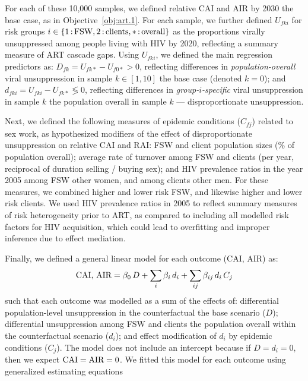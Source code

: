 \par
For each of these 10,000 samples, we defined
relative CAI and AIR by 2030 \vs the base case, as in Objective~\ref{obj:art.1}.
For each sample, we further defined
$U_{fki}$ for risk groups $i \in \{1{\,:\,}\textnormal{FSW}, 2{\,:\,}\textnormal{clients}, *{\,:\,}\textnormal{overall}\}$
as the proportions virally unsuppressed among people living with HIV by 2020,
reflecting a summary measure of ART cascade gaps.
Using $U_{fki}$, we defined the main regression predictors as:
$D_{fk} = U_{fk*} - U_{f0*} > 0$, reflecting differences in
\emph{population-overall} viral unsuppression in sample $k \in [1,10]$
\vs the base case (denoted $k = 0$); and
$d_{fki} = U_{fki} - U_{fk*} \lessgtr 0$, reflecting differences in
\emph{group-$i$-specific} viral unsuppression in sample $k$
\vs the population overall in sample $k$ --- \ie disproportionate unsuppression.
\par
Next, we defined the following measures of epidemic conditions ($C_{fj}$) related to sex work,
as hypothesized modifiers of the effect of disproportionate unsuppression on relative CAI and RAI:
FSW and client population sizes (\% of population overall);
average rate of turnover among FSW and clients (per year, reciprocal of duration selling / buying sex); and
HIV prevalence ratios in the year 2005 among FSW \vs other women, and among clients \vs other men.
For these measures, we combined higher and lower risk FSW, and likewise higher and lower risk clients.
We used HIV prevalence ratios in 2005 to reflect summary measures of risk heterogeneity prior to ART,
as compared to including all modelled risk factors for HIV acquisition,
which could lead to overfitting and improper inference due to effect mediation.
\par
Finally, we defined a general linear model for each outcome (CAI, AIR) as:
\begin{equation}\label{eq:art.2.glm}
  \textnormal{CAI, AIR} = \beta_0\,D
                 + \sum_i \beta_i\,d_i
                 + \sum_{ij} \beta_{ij}\,d_i\,C_j
\end{equation}
such that each outcome was modelled as a sum of the effects of:
differential population-level unsuppression in the counterfactual \vs the base scenario ($D$);
differential unsuppression among FSW and clients
\vs the population overall within the counterfactual scenario ($d_i$); and
effect modification of $d_i$ by epidemic conditions ($C_j$).
The model does not include an intercept because if $D = d_i = 0$,
then we expect $\textnormal{CAI} = \textnormal{AIR} = 0$.
We fitted this model for each outcome using generalized estimating equations \cite{Hojsgaard2006}
